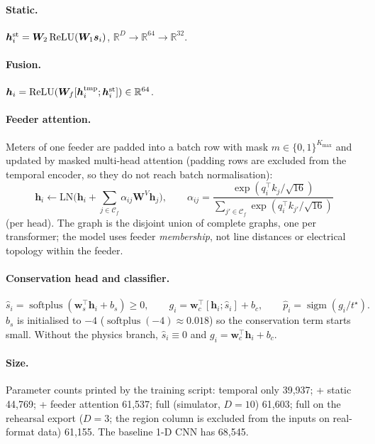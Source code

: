 \documentclass[11pt,a4paper]{article}
\theoremstyle{plain}
\theoremstyle{definition}
\theoremstyle{remark}
\newcommand{\R}{\mathbb{R}}
\newcommand{\sig}{\operatorname{sigm}}
\newcommand{\softplus}{\operatorname{softplus}}
\begin{document}
\paragraph{Static.} $\bm h^{\rm st}_i=\bm W_2\,\mathrm{ReLU}(\bm W_1\bm s_i)$, $\R^D\to\R^{64}\to\R^{32}$.

\paragraph{Fusion.} $\bm h_i=\mathrm{ReLU}(\bm W_f[\bm h^{\rm tmp}_i;\bm h^{\rm st}_i])\in\R^{64}$.

\paragraph{Feeder attention.} Meters of one feeder are padded into a batch row with mask $m\in\{0,1\}^{K_{\max}}$ and updated by masked multi-head attention (padding rows are excluded from the temporal encoder, so they do not reach batch normalisation):
\begin{equation}
\bm h_i\leftarrow\mathrm{LN}\Big(\bm h_i+\sum_{j\in\mathcal C_f}\alpha_{ij}\bm W^V\bm h_j\Big),\qquad
\alpha_{ij}=\frac{\exp(q_i^\top k_j/\sqrt{16})}{\sum_{j'\in\mathcal C_f}\exp(q_i^\top k_{j'}/\sqrt{16})}
\end{equation}
(per head). The graph is the disjoint union of complete graphs, one per transformer; the model uses feeder \emph{membership}, not line distances or electrical topology within the feeder.

\paragraph{Conservation head and classifier.}
\begin{equation}
\hat s_i=\softplus(\bm w_s^\top\bm h_i+b_s)\ge0,\qquad
g_i=\bm w_c^\top[\bm h_i;\hat s_i]+b_c,\qquad \hat p_i=\sig(g_i/t^\star).
\end{equation}
$b_s$ is initialised to $-4$ ($\softplus(-4)\approx0.018$) so the conservation term starts small. Without the physics branch, $\hat s_i\equiv0$ and $g_i=\bm w_c^\top\bm h_i+b_c$.

\paragraph{Size.} Parameter counts printed by the training script: temporal only 39{,}937; + static 44{,}769; + feeder attention 61{,}537; full (simulator, $D=10$) 61{,}603; full on the rehearsal export ($D=3$; the region column is excluded from the inputs on real-format data) 61{,}155. The baseline 1-D CNN has 68{,}545.
\end{document}
